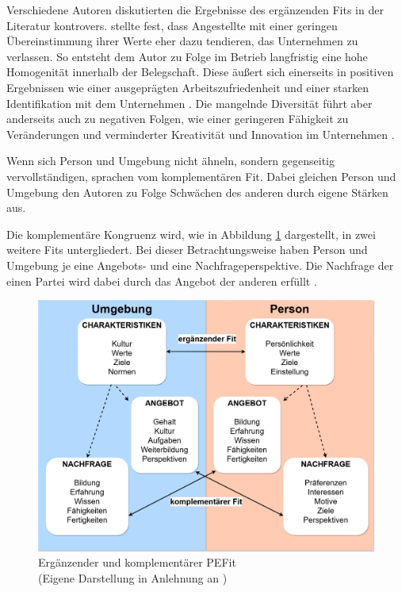 Verschiedene Autoren diskutierten die Ergebnisse des ergänzenden Fits in der Literatur kontrovers. \textcite[S. 6]{schneider:1987} stellte fest, dass Angestellte mit einer geringen Übereinstimmung ihrer Werte eher dazu tendieren, das Unternehmen zu verlassen. So entsteht dem Autor zu Folge im Betrieb langfristig eine hohe Homogenität innerhalb der Belegschaft. Diese äußert sich einerseits in positiven Ergebnissen wie einer ausgeprägten Arbeitszufriedenheit und einer starken Identifikation mit dem Unternehmen \cite[S. 26]{kristof:1996}. Die mangelnde Diversität führt aber anderseits auch zu negativen Folgen, wie einer geringeren Fähigkeit zu Veränderungen \cite[S. 10]{schneider:1987} und verminderter Kreativität \cite[S. 7]{chatman:1998} und Innovation im Unternehmen \cite[S. 11]{chatman:1989}.

Wenn sich Person und Umgebung nicht ähneln, sondern gegenseitig vervollständigen, sprachen \textcite[S. 4]{muchinsky:1987} vom komplementären Fit. Dabei gleichen Person und Umgebung den Autoren zu Folge Schwächen des anderen durch eigene Stärken aus.

Die komplementäre Kongruenz wird, wie in Abbildung \ref{fig:personEnvironmentFit:supplementaryUndComplementary:abb1} dargestellt, in zwei weitere Fits untergliedert. Bei dieser Betrachtungsweise haben Person und Umgebung je eine Angebots- und eine Nachfrageperspektive. Die Nachfrage der einen Partei wird dabei durch das Angebot der anderen erfüllt \cite[S. 2ff.]{caplan:1987}\cite[S. 2ff.]{edwards:1991}\cite[S. 2]{copingAndAdaption:1974}\cite[S. 3f.]{kristof:1996}.

\begin{figure}[h]
	\centering
	\includegraphics[width=1\textwidth]{gfx/supplementaryComplementaryFit.jpg}
	\caption[Ergänzender und komplementärer \acs{PEFit}]{Ergänzender und komplementärer \acs{PEFit}\\
	(Eigene Darstellung in Anlehnung an \cite[S. 4]{kristof:1996})}
	\label{fig:personEnvironmentFit:supplementaryUndComplementary:abb1}
\end{figure}


